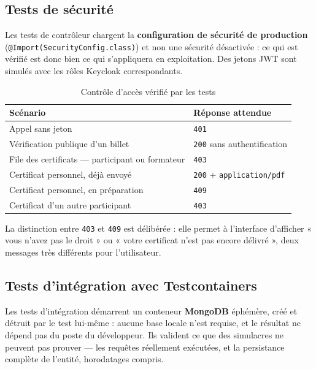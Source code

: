 \subsection{Tests de sécurité}
Les tests de contrôleur chargent la \textbf{configuration de sécurité de production}
(\texttt{@Import(SecurityConfig.class)}) et non une sécurité désactivée : ce qui est
vérifié est donc bien ce qui s'appliquera en exploitation. Des jetons JWT sont simulés
avec les rôles Keycloak correspondants.

\begin{table}[H]\centering\renewcommand{\arraystretch}{1.25}
\begin{tabular}{|p{8.5cm}|p{4cm}|}\hline
\rowcolor{gray!15}\textbf{Scénario} & \textbf{Réponse attendue} \\ \hline
Appel sans jeton & \texttt{401} \\ \hline
Vérification publique d'un billet & \texttt{200} sans authentification \\ \hline
File des certificats — participant ou formateur & \texttt{403} \\ \hline
Certificat personnel, déjà envoyé & \texttt{200} + \texttt{application/pdf} \\ \hline
Certificat personnel, en préparation & \texttt{409} \\ \hline
Certificat d'un autre participant & \texttt{403} \\ \hline
\end{tabular}
\caption{Contrôle d'accès vérifié par les tests}\label{tab:securite}
\end{table}

La distinction entre \texttt{403} et \texttt{409} est délibérée : elle permet à l'interface
d'afficher « vous n'avez pas le droit » ou « votre certificat n'est pas encore délivré »,
deux messages très différents pour l'utilisateur.

\subsection{Tests d'intégration avec Testcontainers}
Les tests d'intégration démarrent un conteneur \textbf{MongoDB} éphémère, créé et détruit
par le test lui-même : aucune base locale n'est requise, et le résultat ne dépend pas du
poste du développeur. Ils valident ce que des simulacres ne peuvent pas prouver — les
requêtes réellement exécutées, et la persistance complète de l'entité, horodatages compris.

